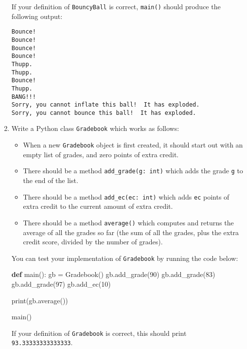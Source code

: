 \documentclass[]{article}
\newenvironment{Shaded}{}{}
\newcommand{\BuiltInTok}[1]{#1}
\newcommand{\DecValTok}[1]{\textcolor[rgb]{0.25,0.63,0.44}{#1}}
\newcommand{\KeywordTok}[1]{\textcolor[rgb]{0.00,0.44,0.13}{\textbf{#1}}}
\newcommand{\NormalTok}[1]{#1}
\newcommand{\OperatorTok}[1]{\textcolor[rgb]{0.40,0.40,0.40}{#1}}
\providecommand{\tightlist}{%
  \setlength{\itemsep}{0pt}\setlength{\parskip}{0pt}}
\begin{document}
\begin{enumerate}
  If your definition of \texttt{BouncyBall} is correct, \texttt{main()}
  should produce the following output:

\begin{verbatim}
Bounce!
Bounce!
Bounce!
Bounce!
Thupp.
Thupp.
Bounce!
Thupp.
BANG!!!
Sorry, you cannot inflate this ball!  It has exploded.
Sorry, you cannot bounce this ball!  It has exploded.
\end{verbatim}
\item
  Write a Python class \texttt{Gradebook} which works as follows:

  \begin{itemize}
  \tightlist
  \item
    When a new \texttt{Gradebook} object is first created, it should
    start out with an empty list of grades, and zero points of extra
    credit.
  \item
    There should be a method \texttt{add\_grade(g:\ int)} which adds the
    grade \texttt{g} to the end of the list.
  \item
    There should be a method \texttt{add\_ec(ec:\ int)} which adds
    \texttt{ec} points of extra credit to the current amount of extra
    credit.
  \item
    There should be a method \texttt{average()} which computes and
    returns the average of all the grades so far (the sum of all the
    grades, plus the extra credit score, divided by the number of
    grades).
  \end{itemize}

  You can test your implementation of \texttt{Gradebook} by running the
  code below:

\begin{Shaded}
\begin{Highlighting}[]
\KeywordTok{def}\NormalTok{ main():}
\NormalTok{    gb }\OperatorTok{=}\NormalTok{ Gradebook()}
\NormalTok{    gb.add_grade(}\DecValTok{90}\NormalTok{)}
\NormalTok{    gb.add_grade(}\DecValTok{83}\NormalTok{)}
\NormalTok{    gb.add_grade(}\DecValTok{97}\NormalTok{)}
\NormalTok{    gb.add_ec(}\DecValTok{10}\NormalTok{)}

    \BuiltInTok{print}\NormalTok{(gb.average())}

\NormalTok{main()}
\end{Highlighting}
\end{Shaded}

  If your definition of \texttt{Gradebook} is correct, this should print
  \texttt{93.33333333333333}.
\end{enumerate}
\end{document}
